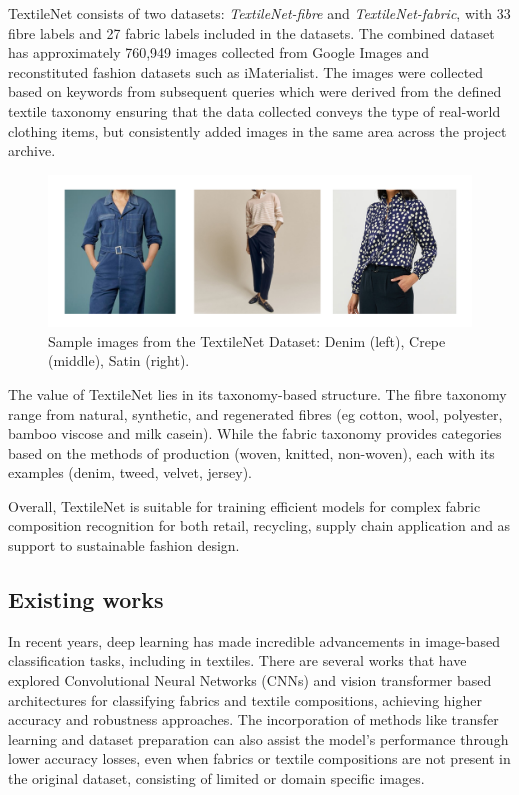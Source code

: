 TextileNet consists of two datasets: \textit{TextileNet-fibre} and \textit{TextileNet-fabric}, with 33 fibre labels and 27 fabric labels included in the datasets. The combined dataset has approximately 760,949 images collected from Google Images and reconstituted fashion datasets such as iMaterialist. The images were collected based on keywords from subsequent queries which were derived from the defined textile taxonomy ensuring that the data collected conveys the type of real-world clothing items, but consistently added images in the same area across the project archive.

\begin{figure}[H]
    \centering
    \begin{minipage}{0.8\linewidth}
        \includegraphics[width=\linewidth]{images/TextileNetDataset.png}
    \end{minipage}
    \caption[Sample images from the TextileNet Dataset]{Sample images from the TextileNet Dataset: Denim (left), Crepe (middle), Satin (right).}
\end{figure}

The value of TextileNet lies in its taxonomy-based structure. The fibre taxonomy range from natural, synthetic, and regenerated fibres (eg cotton, wool, polyester, bamboo viscose and milk casein). While the fabric taxonomy provides categories based on the methods of production (woven, knitted, non-woven), each with its examples (denim, tweed, velvet, jersey).

Overall, TextileNet is suitable for training efficient models for complex fabric composition recognition for both retail, recycling, supply chain application and as support to sustainable fashion design.

\subsection{Existing works}

In recent years, deep learning has made incredible advancements in image-based classification tasks, including in textiles. There are several works that have explored Convolutional Neural Networks (CNNs) and vision transformer based architectures for classifying fabrics and textile compositions, achieving higher accuracy and robustness approaches. The incorporation of methods like transfer learning and dataset preparation can also assist the model's performance through lower accuracy losses, even when fabrics or textile compositions are not present in the original dataset, consisting of limited or domain specific images. 


